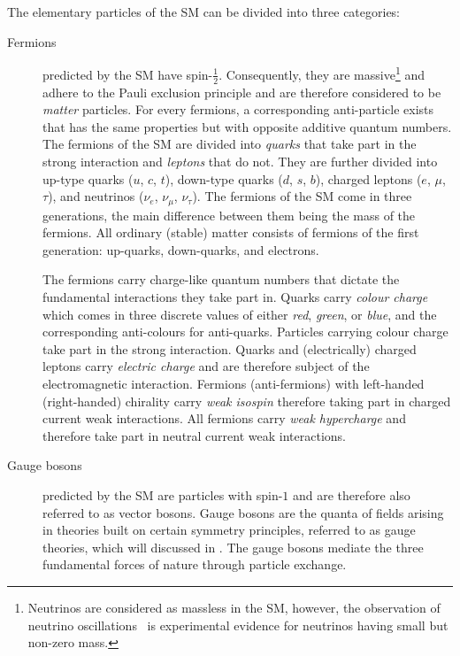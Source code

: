 The elementary particles of the SM can be divided into three categories:
\begin{description}

\item[Fermions] predicted by the SM have spin-$\frac{1}{2}$. Consequently, they
  are massive\footnote{Neutrinos are considered as massless in the SM, however,
    the observation of neutrino
    oscillations~\cite{Super-Kamiokande:1998kpq,SNO:2002tuh} is experimental
    evidence for neutrinos having small but non-zero mass.} and adhere to the
  Pauli exclusion principle and are therefore considered to be \emph{matter}
  particles. For every fermions, a corresponding anti-particle exists that has
  the same properties but with opposite additive quantum numbers. The fermions
  of the SM are divided into \emph{quarks} that take part in the strong
  interaction and \emph{leptons} that do not. They are further divided into
  up-type quarks ($u$, $c$, $t$), down-type quarks ($d$, $s$, $b$), charged
  leptons ($e$, $\mu$, $\tau$), and neutrinos ($\nu_e$, $\nu_\mu$,
  $\nu_\tau$). The fermions of the SM come in three generations, the main
  difference between them being the mass of the fermions. All ordinary (stable)
  matter consists of fermions of the first generation: up-quarks, down-quarks,
  and electrons.

  The fermions carry charge-like quantum numbers that dictate the fundamental
  interactions they take part in. Quarks carry \emph{colour charge} which comes
  in three discrete values of either \emph{red}, \emph{green}, or \emph{blue},
  and the corresponding anti-colours for anti-quarks. Particles carrying colour
  charge take part in the strong interaction. Quarks and (electrically) charged
  leptons carry \emph{electric charge} and are therefore subject of the
  electromagnetic interaction. Fermions (anti-fermions) with left-handed
  (right-handed) chirality carry \emph{weak isospin} therefore taking part in
  charged current weak interactions. All fermions carry \emph{weak hypercharge}
  and therefore take part in neutral current weak interactions.

\item[Gauge bosons] predicted by the SM are particles with spin-$1$ and are
  therefore also referred to as vector bosons. Gauge bosons are the quanta of
  fields arising in theories built on certain symmetry principles, referred to
  as gauge theories, which will discussed in
  . The gauge bosons mediate the three
  fundamental forces of nature through particle exchange.


\end{description}
